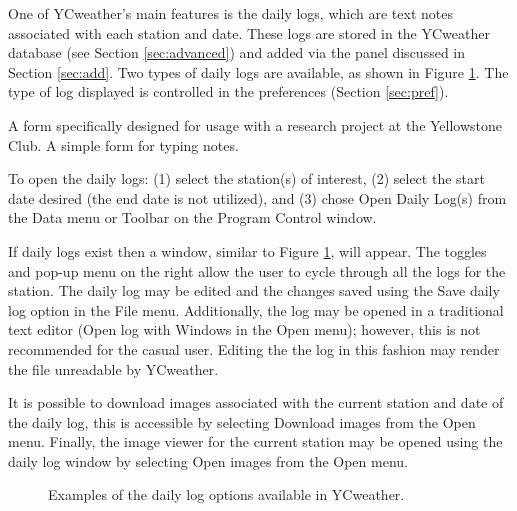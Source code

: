  \label{sec:dailylogs}
One of YCweather's main features is the daily logs, which are text notes associated with each station and date.  These logs are stored in the YCweather database (see Section \ref{sec:advanced}) and added via the panel discussed in Section \ref{sec:add}.  Two types of daily logs are available, as shown in Figure \ref{fig:exlog}.  The type of log displayed is controlled in the preferences (Section \ref{sec:pref}).
\begin{enumerate}
	 A form specifically designed for usage with a research project at the Yellowstone Club.
	 A simple form for typing notes.
\end{enumerate}

To open the daily logs: (1) select the station(s) of interest, (2) select the start date desired (the end date is not utilized), and
(3) chose Open Daily Log(s) from the Data menu or Toolbar on the Program Control window.

If daily logs exist then a window, similar to Figure \ref{fig:exlog}, will appear.  The toggles and pop-up menu on the right allow the user to cycle through all the logs for the station.   The daily log may be edited and the changes saved using the Save daily log option in the File menu. Additionally, the log may be opened in a traditional text editor (Open log with Windows in the Open menu); however, this is not recommended for the casual user. Editing the the log in this fashion may render the file unreadable by YCweather.  

It is possible to download images associated with the current station and date of the daily log, this is accessible by selecting Download images from the Open menu.  Finally, the image viewer for the current station may be opened using the daily log window by selecting Open images from the Open menu.

\begin{figure}[ht!]
	\quad
	\caption{Examples of the daily log options available in YCweather.}
	\label{fig:exlog}
\end{figure}
